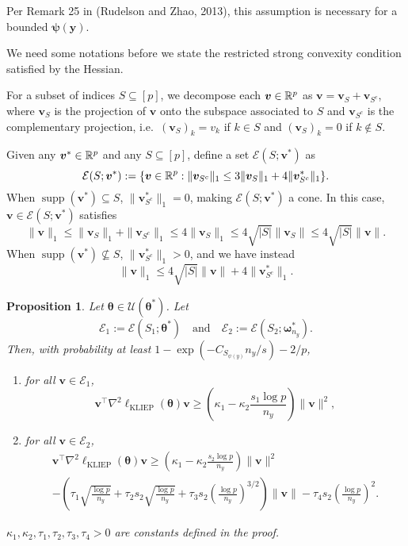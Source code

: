 \documentclass[11pt]{article}
\numberwithin{equation}{section}
\numberwithin{theorem}{section}
\DeclareMathOperator*{\supp}{supp}
\def\fatv{\boldsymbol{v}}
\def\faty{\boldsymbol{y}}
\def\fattheta{\boldsymbol{\theta}}
\def\fatpsi{\boldsymbol{\psi}}
\def\fatomega{\boldsymbol{\omega}}
\newtheorem{prop}[lem]{Proposition}
\theoremstyle{definition}
\theoremstyle{remark}
\begin{document}
\noindent
Per Remark 25 in (Rudelson and Zhao, 2013), this assumption is necessary for a bounded $\fatpsi(\faty)$.

We need some notations before we state the restricted strong convexity condition satisfied by the Hessian.

For a subset of indices $S \subseteq [p]$, we decompose each $\fatv \in \RR^p$ as $\fatv = \fatv_S + \fatv_{S^c}$, where $\fatv_S$ is the projection of $\fatv$ onto the subspace associated to $S$ and $\fatv_{S^c}$ is the complementary projection, i.e.~$(\fatv_S)_k = v_k$ if $k \in S$ and $(\fatv_S)_k = 0$ if $k \notin S$.

Given any $\fatv^* \in \RR^p$ and any $S \subseteq [p]$, define a set $\mathcal{E}(S;\fatv^*)$ as
\begin{equation}
\mathcal{E}(S;\fatv^*)
:= \{ \fatv \in \RR^p : \|\fatv_{S^c}\|_1 \leq 3 \|\fatv_S\|_1 + 4 \| \fatv_{S^c}^*\|_1 \}.
\end{equation}
When $\supp(\fatv^*) \subseteq S$, $\|\fatv_{S^c}^*\|_1 = 0$, making $\mathcal{E}(S;\fatv^*)$ a cone.
In this case, $\fatv \in \mathcal{E}(S;\fatv^*)$ satisfies
\begin{equation} \label{eq:1norm_bd_cone}
\|\fatv\|_1
\leq \|\fatv_S\|_1 + \|\fatv_{S^c}\|_1
\leq 4\|\fatv_S\|_1
\leq 4 \sqrt{|S|} \|\fatv_S\|
\leq 4 \sqrt{|S|} \|\fatv\|.
\end{equation}
When $\supp(\fatv^*) \not\subseteq S$, $\|\fatv_{S^c}^*\|_1 > 0$, and we have instead
\begin{equation} \label{eq:1norm_bd_gen}
\|\fatv\|_1
\leq 4\sqrt{|S|}\|\fatv\| + 4\|\fatv_{S^c}^*\|_1.
\end{equation}

\begin{prop} \label{prop:rsc}
Let $\fattheta \in \mathcal{U}(\fattheta^*)$.
Let
\begin{equation}
\mathcal{E}_1 := \mathcal{E}(S_1;\fattheta^*)
\quad \text{and} \quad
\mathcal{E}_2 := \mathcal{E}(S_2;\fatomega_{n_y}^*).
\end{equation}
Then, with probability at least $1 - \exp(-C_{S_{\psi(y)}} n_y / s) - 2/p$,
\begin{enumerate}
\item for all $\fatv \in \mathcal{E}_1$,
\begin{equation}
\fatv^\top \nabla^2 \ell_\text{KLIEP}(\fattheta) \fatv \geq \left( \kappa_1 - \kappa_2 \frac{s_1 \log p}{n_y} \right) \|\fatv\|^2,
\end{equation}
\item for all $\fatv \in \mathcal{E}_2$,
\begin{multline}
\fatv^\top \nabla^2 \ell_\text{KLIEP}(\fattheta) \fatv
\geq \left( \kappa_1 - \kappa_2 \frac{s_2 \log p}{n_y} \right) \|\fatv\|^2 \\
- \left( \tau_1 \sqrt{\frac{\log p}{n_y}} + \tau_2 s_2 \sqrt{\frac{\log p}{n_y}} + \tau_3 s_2 \left( \frac{\log p}{n_y} \right)^{3/2} \right) \|\fatv\| - \tau_4 s_2 \left( \frac{\log p}{n_y} \right)^2.
\end{multline}
\end{enumerate}
$\kappa_1, \kappa_2, \tau_1, \tau_2, \tau_3, \tau_4 > 0$ are constants defined in the proof.
\end{prop}
\end{document}

